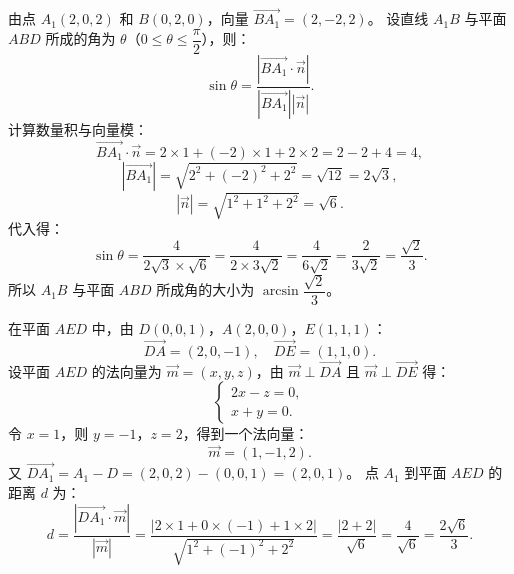 \begin{answer}

由点 $A_1(2, 0, 2)$ 和 $B(0, 2, 0)$，向量 $\vec{BA_1} = (2, -2, 2)$。
设直线 $A_1B$ 与平面 $ABD$ 所成的角为 $\theta$（$0 \le \theta \le \dfrac{\pi}{2}$），则：
\nopagebreak[4]
\[\sin\theta = \frac{|\vec{BA_1} \cdot \vec{n}|}{|\vec{BA_1}| |\vec{n}|}.\]
计算数量积与向量模：
\nopagebreak[4]
\[\vec{BA_1} \cdot \vec{n} = 2 \times 1 + (-2) \times 1 + 2 \times 2 = 2 - 2 + 4 = 4,\]
\nopagebreak[4]
\[|\vec{BA_1}| = \sqrt{2^2 + (-2)^2 + 2^2} = \sqrt{12} = 2\sqrt{3},\]
\nopagebreak[4]
\[|\vec{n}| = \sqrt{1^2 + 1^2 + 2^2} = \sqrt{6}.\]
代入得：
\nopagebreak[4]
\[\sin\theta = \frac{4}{2\sqrt{3} \times \sqrt{6}} = \frac{4}{2 \times 3\sqrt{2}} = \frac{4}{6\sqrt{2}} = \frac{2}{3\sqrt{2}} = \frac{\sqrt{2}}{3}.\]
所以 $A_1B$ 与平面 $ABD$ 所成角的大小为 $\arcsin\dfrac{\sqrt{2}}{3}$。


在平面 $AED$ 中，由 $D(0, 0, 1)$，$A(2, 0, 0)$，$E(1, 1, 1)$：
\nopagebreak[4]
\[\vec{DA} = (2, 0, -1), \quad \vec{DE} = (1, 1, 0).\]
设平面 $AED$ 的法向量为 $\vec{m} = (x, y, z)$，由 $\vec{m} \perp \vec{DA}$ 且 $\vec{m} \perp \vec{DE}$ 得：
\nopagebreak[4]
\[\begin{cases} 2x - z = 0, \\ x + y = 0. \end{cases}\]
令 $x = 1$，则 $y = -1$，$z = 2$，得到一个法向量：
\nopagebreak[4]
\[\vec{m} = (1, -1, 2).\]
又 $\vec{DA_1} = A_1 - D = (2, 0, 2) - (0, 0, 1) = (2, 0, 1)$。
点 $A_1$ 到平面 $AED$ 的距离 $d$ 为：
\nopagebreak[4]
\[d = \frac{|\vec{DA_1} \cdot \vec{m}|}{|\vec{m}|} = \frac{|2 \times 1 + 0 \times (-1) + 1 \times 2|}{\sqrt{1^2 + (-1)^2 + 2^2}} = \frac{|2 + 2|}{\sqrt{6}} = \frac{4}{\sqrt{6}} = \frac{2\sqrt{6}}{3}.\]



\end{answer}
